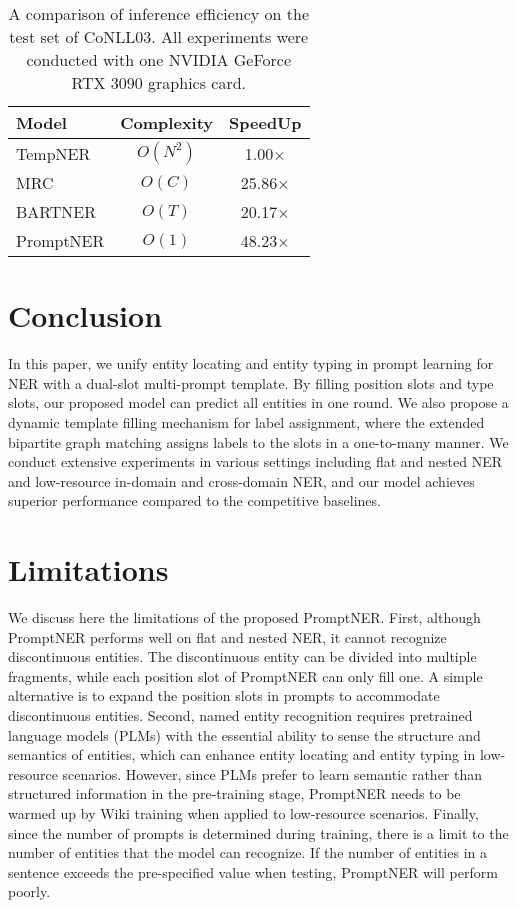 \documentclass[11pt]{article}
\begin{document}
\begin{table}[!htp]
    \centering
    \small
    \begin{tabular}{lcc}
    \toprule
    Model & Complexity & SpeedUp \\
    \midrule
     {TempNER \citep{cui-etal-2021-template}} & $O(N^2)$ & 1.00$\times$ \\ {MRC \citep{li-etal-2020-unified}}  & $O(C)$ & 25.86$\times$  \\  {BARTNER \citep{yan-etal-2021-unified-generative}} & $O(T)$  &  20.17$\times$ \\  

     \midrule
     PromptNER & $O(1)$ & 48.23$\times$  \\  \bottomrule
    \end{tabular}
    \caption{A comparison of inference efficiency on the test set of CoNLL03. All experiments were conducted with one NVIDIA GeForce RTX 3090 graphics card.}
    \label{tab:inference}
\end{table}


\section{Conclusion}

In this paper, we unify entity locating and entity typing in prompt learning for NER with a dual-slot multi-prompt template. By filling position slots and type slots, our proposed model can predict all entities in one round. We also propose a dynamic template filling mechanism for label assignment, where the extended bipartite graph matching assigns labels to the slots in a one-to-many manner. We conduct extensive experiments in various settings including flat and nested NER and low-resource in-domain and cross-domain NER, and our model achieves superior performance compared to the competitive baselines. 

\section*{Limitations}

We discuss here the limitations of the proposed PromptNER. First, although PromptNER performs well on flat and nested NER, it cannot recognize discontinuous entities. The discontinuous entity can be divided into multiple fragments, while each position slot of PromptNER can only fill one. A simple alternative is to expand the position slots in prompts to accommodate discontinuous entities. Second, named entity recognition requires pretrained language models (PLMs) with the essential ability to sense the structure and semantics of entities, which can enhance entity locating and entity typing in low-resource scenarios. However, since PLMs prefer to learn semantic rather than structured information in the pre-training stage, PromptNER needs to be warmed up by Wiki training when applied to low-resource scenarios. Finally, since the number of prompts is determined during training, there is a limit to the number of entities that the model can recognize. If the number of entities in a sentence exceeds the pre-specified value when testing, PromptNER will perform poorly.
\end{document}
